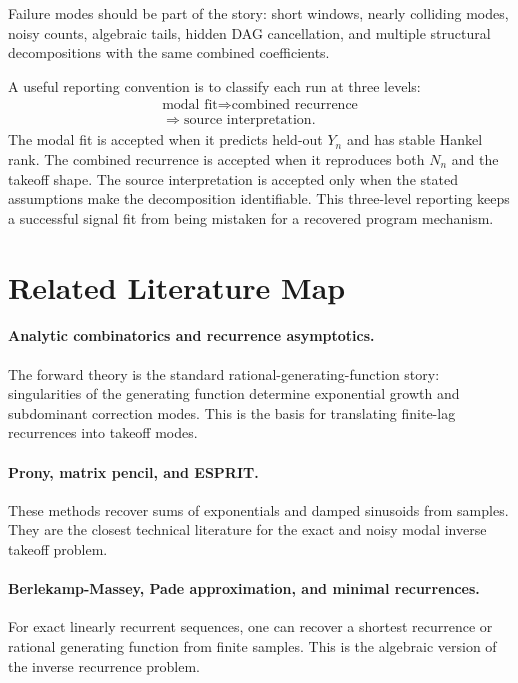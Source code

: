 \documentclass[10pt,twocolumn]{article}
\begin{document}
Failure modes should be part of the story: short windows, nearly colliding
modes, noisy counts, algebraic tails, hidden DAG cancellation, and multiple
structural decompositions with the same combined coefficients.

A useful reporting convention is to classify each run at three levels:
\[
        \begin{gathered}
        \text{modal fit}
        \Rightarrow
        \text{combined recurrence}\\
        \Rightarrow
        \text{source interpretation}.
        \end{gathered}
\]
The modal fit is accepted when it predicts held-out \(Y_n\) and has stable
Hankel rank. The combined recurrence is accepted when it reproduces both
\(N_n\) and the takeoff shape. The source interpretation is accepted only when
the stated assumptions make the decomposition identifiable. This three-level
reporting keeps a successful signal fit from being mistaken for a recovered
program mechanism.

\section{Related Literature Map}

\paragraph{Analytic combinatorics and recurrence asymptotics.}
The forward theory is the standard rational-generating-function story:
singularities of the generating function determine exponential growth and
subdominant correction modes. This is the basis for translating finite-lag
recurrences into takeoff modes.

\paragraph{Prony, matrix pencil, and ESPRIT.}
These methods recover sums of exponentials and damped sinusoids from samples.
They are the closest technical literature for the exact and noisy modal inverse
takeoff problem.

\paragraph{Berlekamp-Massey, Pade approximation, and minimal recurrences.}
For exact linearly recurrent sequences, one can recover a shortest recurrence
or rational generating function from finite samples. This is the algebraic
version of the inverse recurrence problem.
\end{document}
